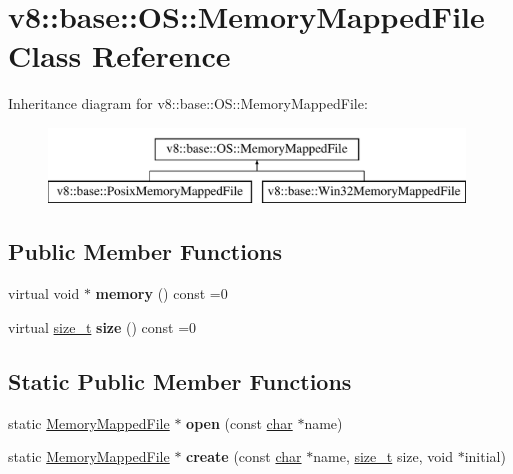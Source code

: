 \hypertarget{classv8_1_1base_1_1OS_1_1MemoryMappedFile}{}\section{v8\+:\+:base\+:\+:OS\+:\+:Memory\+Mapped\+File Class Reference}
\label{classv8_1_1base_1_1OS_1_1MemoryMappedFile}
Inheritance diagram for v8\+:\+:base\+:\+:OS\+:\+:Memory\+Mapped\+File\+:\begin{figure}[H]
\begin{center}
\leavevmode
\includegraphics[height=2.000000cm]{classv8_1_1base_1_1OS_1_1MemoryMappedFile}
\end{center}
\end{figure}
\subsection*{Public Member Functions}
\begin{DoxyCompactItemize}
\item 
\mbox{\label{classv8_1_1base_1_1OS_1_1MemoryMappedFile_a95a5c9b694151392c9d4d210a013dbff}} 
virtual void $\ast$ {\bfseries memory} () const =0
\item 
\mbox{\label{classv8_1_1base_1_1OS_1_1MemoryMappedFile_a56e5f0fe4c5b717648bfab33a2c9b5a6}} 
virtual \mbox{\hyperlink{classsize__t}{size\+\_\+t}} {\bfseries size} () const =0
\end{DoxyCompactItemize}
\subsection*{Static Public Member Functions}
\begin{DoxyCompactItemize}
\item 
\mbox{\label{classv8_1_1base_1_1OS_1_1MemoryMappedFile_a90ed338ee3a3220111d242d4fa22e95f}} 
static \mbox{\hyperlink{classv8_1_1base_1_1OS_1_1MemoryMappedFile}{Memory\+Mapped\+File}} $\ast$ {\bfseries open} (const \mbox{\hyperlink{classchar}{char}} $\ast$name)
\item 
\mbox{\label{classv8_1_1base_1_1OS_1_1MemoryMappedFile_a3c10e7c6b424824c2c6cc8dc1dd65f68}} 
static \mbox{\hyperlink{classv8_1_1base_1_1OS_1_1MemoryMappedFile}{Memory\+Mapped\+File}} $\ast$ {\bfseries create} (const \mbox{\hyperlink{classchar}{char}} $\ast$name, \mbox{\hyperlink{classsize__t}{size\+\_\+t}} size, void $\ast$initial)
\end{DoxyCompactItemize}


